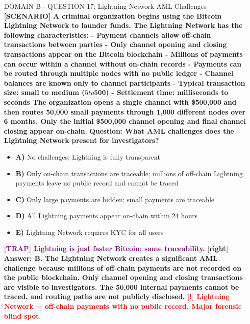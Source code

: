 \documentclass[11pt,a4paper]{beamer}
\newcommand{\redflag}[1]{\textcolor{red}{\textbf{[!] #1}}}
\newcommand{\trap}[1]{\textcolor{purple}{\textbf{[TRAP] #1}}}
\newcommand{\correct}[1]{\textcolor{green!50!black}{\textbf{[right] #1}}}
\newcommand{\scenario}[1]{\textcolor{blue!70!black}{\textbf{[SCENARIO] #1}}}
\newcommand{\option}[1]{\textcolor{black}{\textbf{#1}}}
\begin{document}
\begin{frame}{DOMAIN B - QUESTION 17: Lightning Network AML Challenges}
\scenario{A criminal organization begins using the Bitcoin Lightning Network to launder funds. The Lightning Network has the following characteristics:
- Payment channels allow off-chain transactions between parties
- Only channel opening and closing transactions appear on the Bitcoin blockchain
- Millions of payments can occur within a channel without on-chain records
- Payments can be routed through multiple nodes with no public ledger
- Channel balances are known only to channel participants
- Typical transaction size: small to medium ($5 to $500)
- Settlement time: milliseconds to seconds
The organization opens a single channel with \$500,000 and then routes 50,000 small payments through 1,000 different nodes over 6 months. Only the initial \$500,000 channel opening and final channel closing appear on-chain.}
\vspace{0.2cm}
\textbf{Question: What AML challenges does the Lightning Network present for investigators?}
\vspace{0.1cm}
\begin{itemize}
    \item \option{A)} No challenges; Lightning is fully transparent
    \item \option{B)} Only on-chain transactions are traceable; millions of off-chain Lightning payments leave no public record and cannot be traced
    \item \option{C)} Only large payments are hidden; small payments are traceable
    \item \option{D)} All Lightning payments appear on-chain within 24 hours
    \item \option{E)} Lightning Network requires KYC for all users
\end{itemize}
\vspace{0.2cm}
\trap{Lightning is just faster Bitcoin; same traceability.}
\correct{Answer: B. The Lightning Network creates a significant AML challenge because millions of off-chain payments are not recorded on the public blockchain. Only channel opening and closing transactions are visible to investigators. The 50,000 internal payments cannot be traced, and routing paths are not publicly disclosed.}
\redflag{Lightning Network = off-chain payments with no public record. Major forensic blind spot.}
\end{frame}
\end{document}
